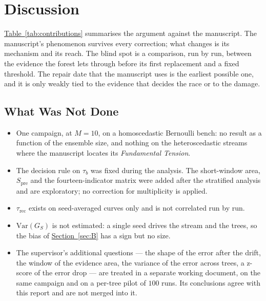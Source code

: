 \documentclass[10pt,conference]{IEEEtran}
\theoremstyle{definition}
\begin{document}
\section{Discussion}
\label{sec:discussion}


\hyperref[tab:contributions]{Table~\ref*{tab:contributions}} summarises the argument against the manuscript. The
manuscript's phenomenon survives every correction; what changes is its mechanism and its
reach. The blind spot is a comparison, run by run, between the evidence the forest lets
through before its first replacement and a fixed threshold. The repair date that the
manuscript uses is the earliest possible one, and it is only weakly tied to the evidence
that decides the race or to the damage.

\subsection{What Was Not Done}

\begin{itemize}
  \item One campaign, at $M = 10$, on a homoscedastic Bernoulli bench: no result as a
    function of the ensemble size, and nothing on the heteroscedastic streams where the
    manuscript locates its \emph{Fundamental Tension}.
  \item The decision rule on $\tau_b$ was fixed during the analysis. The short-window area,
    $S_{\mathrm{pre}}$ and the fourteen-indicator matrix were added after the stratified
    analysis and are exploratory; no correction for multiplicity is applied.
  \item $\tau_{\mathrm{rec}}$ exists on seed-averaged curves only and is not correlated run by
    run.
  \item $\mathrm{Var}(G_S)$ is not estimated: a single seed drives the stream and the trees,
    so the bias of \hyperref[sec:B]{Section~\ref*{sec:B}} has a sign but no size.
  \item The supervisor's additional questions --- the shape of the error after the drift,
    the window of the evidence area, the variance of the error across trees, a z-score of
    the error drop --- are treated in a separate working document, on the same campaign and
    on a per-tree pilot of $100$ runs. Its conclusions agree with this report and are not
    merged into it.
\end{itemize}
\end{document}
